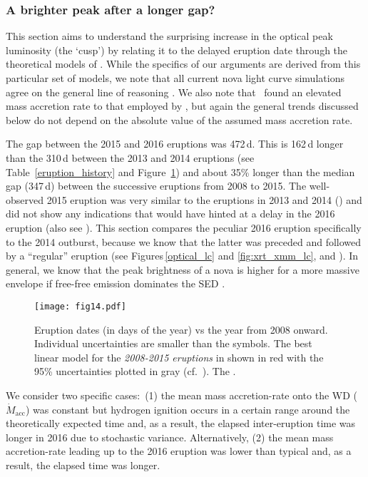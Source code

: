 \documentclass[twocolumn,tighten]{aastex6}
\newcommand{\othreek}{\citetalias{2016ApJ...833..149D}}
\newcommand{\hstphot}{\citetalias{2017ApJ...849...96D}}
\begin{document}
\subsubsection{A brighter peak after a longer gap?}\label{sec:disc_peak}

This section aims to understand the surprising increase in the optical peak luminosity (the `cusp') by relating it to the delayed eruption date through the theoretical models of \citet{2006ApJS..167...59H, 2014ApJ...793..136K, 2017ApJ...838..153K}. While the specifics of our arguments are derived from this particular set of models, we note that all current nova light curve simulations agree on the general line of reasoning \citep[e.g.][]{2005ApJ...623..398Y, 2013ApJ...777..136W}.  We also note that \hstphot\ found an elevated mass accretion rate to that employed by \citet{2014ApJ...793..136K, 2017ApJ...838..153K}, but again the general trends discussed below do not depend on the absolute value of the assumed mass accretion rate.

The gap between the 2015 and 2016 eruptions was 472\,d. This is 162\,d longer than the 310\,d between the 2013 and 2014 eruptions (see Table~\ref{eruption_history} and Figure~\ref{fig:rec_time}) and about 35\% longer than the median gap (347\,d) between the successive eruptions from 2008 to 2015. The well-observed 2015 eruption was very similar to the eruptions in 2013 and 2014 (\othreek) and did not show any indications that would have hinted at a delay in the 2016 eruption (also see \hstphot). This section compares the peculiar 2016 eruption specifically to the 2014 outburst, because we know that the latter was preceded and followed by a ``regular'' eruption (see Figures\,\ref{optical_lc} and \ref{fig:xrt_xmm_lc}, and \othreek). In general, we know that the peak brightness of a nova is higher for a more massive envelope if free-free emission dominates the SED \citep{2006ApJS..167...59H}.

\begin{figure}
\texttt{[image: fig14.pdf]}
\caption{Eruption dates (in days of the year) vs the year from 2008 onward. Individual uncertainties are smaller than the symbols. The best linear model for the \textit{2008-2015 eruptions} in shown in red with the 95\% uncertainties plotted in gray (cf.\ \othreek). The .}
\label{fig:rec_time}
\end{figure}

We consider two specific cases:\ (1) the mean mass accretion-rate onto the WD ($\dot{M}_\mathrm{acc}$) was constant but hydrogen ignition occurs in a certain range around the theoretically expected time and, as a result, the elapsed inter-eruption time was longer in 2016 due to stochastic variance. Alternatively, (2) the mean mass accretion-rate leading up to the 2016 eruption was lower than typical and, as a result, the elapsed time was longer.
\end{document}
